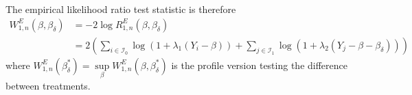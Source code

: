 The empirical likelihood ratio test statistic is therefore
\begin{align}
  W_{1,n}^E(\beta, \beta_\delta) &= -2\log R_{1,n}^E(\beta, \beta_\delta)\\
  &= 2\left(\sum_{i \in \mathcal{I}_0}\log \left(1 + \lambda_1 (Y_i - \beta)\right) + \sum_{j \in \mathcal{I}_1}\log\left(1 + \lambda_2 (Y_j - \beta - \beta_\delta)\right)\right)\nonumber
\end{align}
where $W_{1,n}^E(\beta_\delta^\ast) = \sup\limits_{\beta} W_{1,n}^E(\beta, \beta_\delta^\ast)$ is the profile version testing the difference between treatments.
